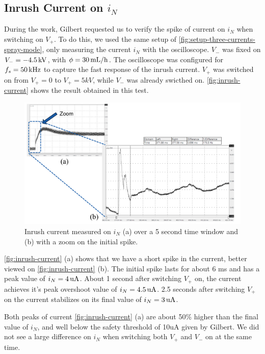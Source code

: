 \documentclass[oneside,12pt]{article}
\begin{document}
\subsection{Inrush Current on $i_N$}

During the work, Gilbert requested us to verify the spike of current on $i_N$ when switching on $V_+$. To do this, we used the same setup 
of \autoref{fig:setup-three-currents-spray-mode}, only measuring the current $i_N$ with the oscilloscope. $V_-$ was fixed on $V_- = - 4.5 \,\mathrm{kV}$, 
with $\phi = 30 \,\mathrm{mL/h}$. The oscilloscope was configured for $f_s = 50 \,\mathrm{kHz}$ to capture the fast response of the inrush current.
$V_+$ was switched on from $V_+ = 0$ to $V_+ = 5 kV$, while $V_-$ was already swicthed on. \autoref{fig:inrush-current} shows the result 
obtained in this test.

\begin{figure}[h!]
    \centering
    \includegraphics[width=\textwidth,trim=1 1 1 1,clip]{figures/inrush-current.png}
    \caption{Inrush current measured on $i_N$ (a) over a 5 second time window and (b) with a zoom on the initial spike.}
    \label{fig:inrush-current}
\end{figure}

\autoref{fig:inrush-current} (a) shows that we have a short spike in the current, better viewed on \autoref{fig:inrush-current} (b).
The initial spike lasts for about 6 ms and has a peak value of $i_N = 4 \,\mathrm{uA}$. About 1 second after switching $V_+$ on, the
current achieves it's peak overshoot value of $i_N = 4.5 \,\mathrm{uA}$. 2.5 seconds after switching $V_+$ on the current stabilizes 
on its final value of $i_N = 3 \,\mathrm{uA}$.

Both peaks of current \autoref{fig:inrush-current} (a) are about 50\% higher than the final value of $i_N$, and well below the 
safety threshold of 10uA given by Gilbert. We did not see a large difference on $i_N$ when switching both $V_+$ and $V_-$ on at the 
same time. 
\end{document}
